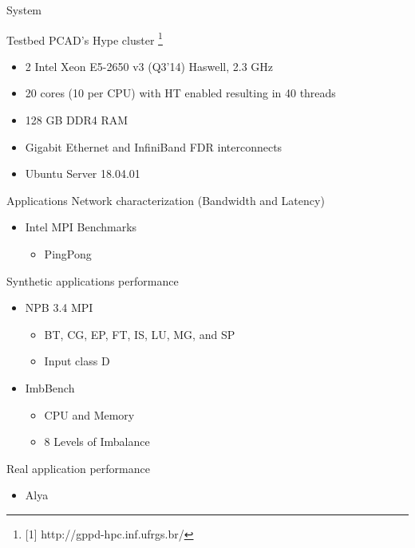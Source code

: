 \documentclass[presentation]{beamer}
\begin{document}
\begin{frame}[allowframebreaks]{System}
\end{frame}

\begin{frame}{Testbed}
PCAD's Hype cluster \footnote{[1] http://gppd-hpc.inf.ufrgs.br/}
\begin{itemize}
\item 2 \texttimes{} Intel Xeon E5-2650 v3 (Q3'14) Haswell, 2.3 GHz
\item 20 cores (10 per CPU) with HT enabled resulting in 40 threads
\item 128 GB DDR4 RAM
\item Gigabit Ethernet and InfiniBand FDR interconnects
\item Ubuntu Server 18.04.01
\vfill
\end{itemize}
\vfill
\end{frame}

\begin{frame}{Applications}
Network characterization (Bandwidth and Latency)
    \begin{itemize}
        \item Intel MPI Benchmarks 
        \begin{itemize}
            \item PingPong
        \end{itemize}
    \end{itemize}
    \pause \vfill
Synthetic applications performance
    \begin{itemize}
        \item NPB 3.4 MPI
        \begin{itemize}
            \item BT, CG, EP, FT, IS, LU, MG, and SP
            \item Input class D
        \pause \vfill
        \end{itemize}
        \item ImbBench 
        \begin{itemize}
            \item CPU and Memory
            \item 8 Levels of Imbalance
        \end{itemize}
        \end{itemize}
        \pause \vfill
Real application performance
    \begin{itemize}
        \item Alya
    \end{itemize}
\end{frame}
\end{document}

